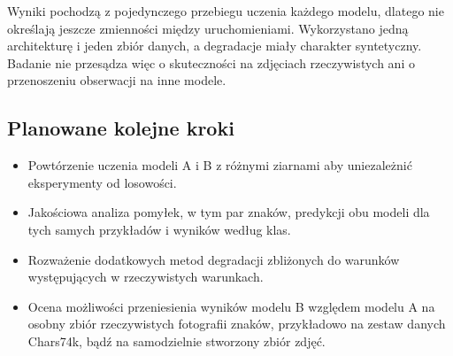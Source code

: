 Wyniki pochodzą z pojedynczego przebiegu uczenia każdego modelu, dlatego
nie określają jeszcze zmienności między uruchomieniami. Wykorzystano
jedną architekturę i jeden zbiór danych, a degradacje miały charakter
syntetyczny. Badanie nie przesądza więc o skuteczności na zdjęciach
rzeczywistych ani o przenoszeniu obserwacji na inne modele.

\subsection{Planowane kolejne kroki}\label{planowane-kolejne-kroki}

\begin{itemize}
  \item
        Powtórzenie uczenia modeli A i B z różnymi ziarnami aby uniezależnić
        eksperymenty od losowości.
  \item
        Jakościowa analiza pomyłek, w tym par znaków, predykcji obu modeli dla
        tych samych przykładów i wyników według klas.
  \item
        Rozważenie dodatkowych metod degradacji zbliżonych do warunków
        występujących w rzeczywistych warunkach.
  \item
        Ocena możliwości przeniesienia wyników modelu B względem modelu A na
        osobny zbiór rzeczywistych fotografii znaków, przykładowo na zestaw
        danych Chars74k, bądź na samodzielnie stworzony zbiór zdjęć.
\end{itemize}

